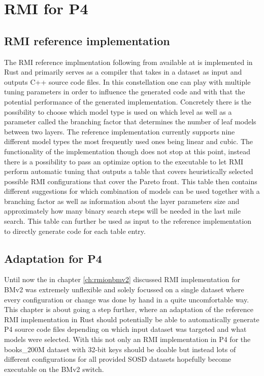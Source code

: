 
\chapter{RMI for P4}
\label{ch:rmiforp4}

\section{RMI reference implementation}
The RMI reference implmentation following from \cite{cdfshop} available at \cite{rmi-reference} is implemented in Rust and primarily serves as a compiler that takes in a dataset as input and outputs C++ source code files. In this constellation one can play with multiple tuning parameters in order to influence the generated code and with that the potential performance of the generated implementation. Concretely there is the possibility to choose which model type is used on which level as well as a parameter called the branching factor that determines the number of leaf models between two layers. The reference implementation currently supports nine different model types the most frequently used ones being linear and cubic. The functionality of the implementation though does not stop at this point, instead there is a possibility to pass an optimize option to the executable to let RMI perform automatic tuning that outputs a table that covers heuristically selected possible RMI configurations that cover the Pareto front. This table then contains different suggestions for which combination of models can be used together with a branching factor as well as information about the layer parameters size and approximately how many binary search steps will be needed in the last mile search. This table can further be used as input to the reference implementation to directly generate code for each table entry.

\section{Adaptation for P4}
Until now the in chapter \ref{ch:rmionbmv2} discussed RMI implementation for BMv2 was extremely unflexible and solely focussed on a single dataset where every configuration or change was done by hand in a quite uncomfortable way. This chapter is about going a step further, where an adaptation of the reference RMI implementation in Rust should potentially be able to automatically generate P4 source code files depending on which input dataset was targeted and what models were selected. With this not only an RMI implementation in P4 for the books\_200M dataset with 32-bit keys should be doable but instead lots of different configurations for all provided SOSD datasets hopefully become executable on the BMv2 switch.\\

